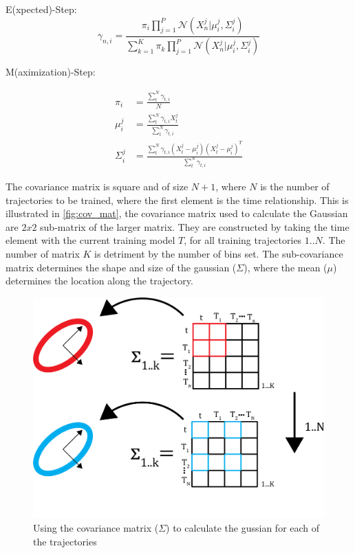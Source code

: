 E(xpected)-Step:
\begin{equation}
    \gamma_{n,i} = \frac{\pi_i \prod_{j=1}^{P} \mathcal{N}( X_n^j | \mu_i^j, \Sigma_i^j)  }{   \sum_{k=1}^{K} \pi_k \prod_{j=1}^{P} \mathcal{N}( X_n^j | \mu_i^j, \Sigma_i^j)}
    \label{eq:EstepTPGMM}
\end{equation}

 M(aximization)-Step:
 
\begin{equation} 
\begin{aligned} 
    \pi_i &= \frac{\sum_t^N \gamma_{t,i}}{N} \\ 
    \mu_i^j &= \frac{\sum_t^N \gamma_{t,i} X_t^j}{\sum_t^N \gamma_{t,i}} \\ 
    \Sigma_i^j &= \frac{\sum_t^N \gamma_{t,i} ( X_t^j - \mu_i^j)  ( X_t^j - \mu_i^j)^T   }{\sum_t^N \gamma_{t,i}}  
\end{aligned} 
\label{eq:MstepTPGMM} 
\end{equation} 


The covariance matrix is square and of size $N+1$, where $N$ is the number of trajectories to be trained, where the first element is the time relationship. This is illustrated in \autoref{fig:cov_mat}, the covariance matrix used to calculate the Gaussian are $2x2$ sub-matrix of the larger matrix. They are constructed by taking the time element with the current training model $T$, for all training trajectories $1..N$. The number of matrix $K$ is detriment by the number of bins set. The sub-covariance matrix determines the shape and size of the gaussian ($\Sigma$), where the mean  ($\mu$) determines the location along the trajectory. 


\begin{figure}
    \centering
    \includegraphics{images/background/cov_matrix.png}
    \caption[Covariance Matrix Illustration]{Using the covariance matrix ($\Sigma$) to calculate the gussian for each of the trajectories}
    \label{fig:cov_mat}
\end{figure}



